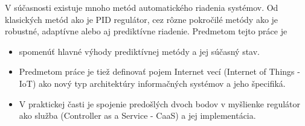 \indent V súčasnosti existuje mnoho metód automatického riadenia systémov. Od klasických metód ako je PID regulátor, cez rôzne pokročilé metódy ako je robustné, adaptívne alebo aj prediktívne riadenie. Predmetom tejto práce je
\begin{itemize}
\item  spomenúť hlavné výhody prediktívnej metódy a jej súčasný stav.
\item  Predmetom práce je tiež definovať pojem Internet vecí (Internet of Things - IoT) ako nový typ architektúry informačných systémov a jeho špecifiká. 
\item  V praktickej časti je spojenie predošlých dvoch bodov v myšlienke regulátor ako služba (Controller as a Service - CaaS) a jej implementácia. 
\end{itemize}
 
